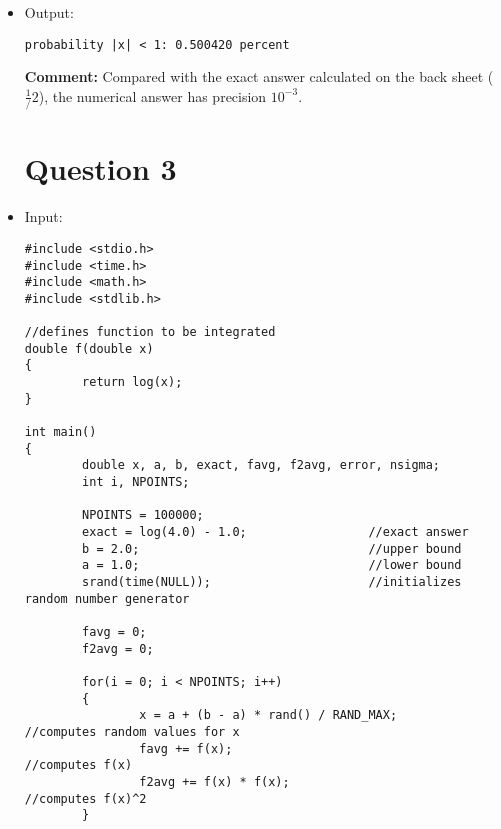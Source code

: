 \documentclass[10pt]{article}
\begin{document}
\begin{itemize}
\begin{verbatim}
int main()
{
        int i, N = 100000;
        double x[N], value[N], prob, ab;
        srand(time(NULL));
        
        prob = 0;
        
        for(i = 0; i < N; i++)
        {
                x[i] = rand() / (RAND_MAX + 1.0);
                
                value[i] = tan(M_PI * x[i]);

                if(value[i] < 1.0 && value[i] > -1.0)
                        prob += 1.0 / N;
        }

        printf("probability |x| < 1: %f percent\n", prob);
}
\end{verbatim}
\item Output:
\begin{verbatim}
probability |x| < 1: 0.500420 percent
\end{verbatim}
\textbf{Comment:} Compared with the exact answer calculated on the back sheet ($\frac{1}/{2}$), the numerical answer has precision $10^{-3}$.

\section*{Question 3}
\item Input:
\begin{verbatim}
#include <stdio.h>
#include <time.h>
#include <math.h>
#include <stdlib.h>

//defines function to be integrated
double f(double x)
{
        return log(x);
}

int main()
{
        double x, a, b, exact, favg, f2avg, error, nsigma;
        int i, NPOINTS;
        
        NPOINTS = 100000;
        exact = log(4.0) - 1.0;                 //exact answer
        b = 2.0;                                //upper bound
        a = 1.0;                                //lower bound
        srand(time(NULL));                      //initializes random number generator 

        favg = 0;
        f2avg = 0;
        
        for(i = 0; i < NPOINTS; i++)
        {
                x = a + (b - a) * rand() / RAND_MAX;	       //computes random values for x
                favg += f(x);                                  //computes f(x)
                f2avg += f(x) * f(x);                          //computes f(x)^2
        }


\end{verbatim}
\end{itemize}
\end{document}
